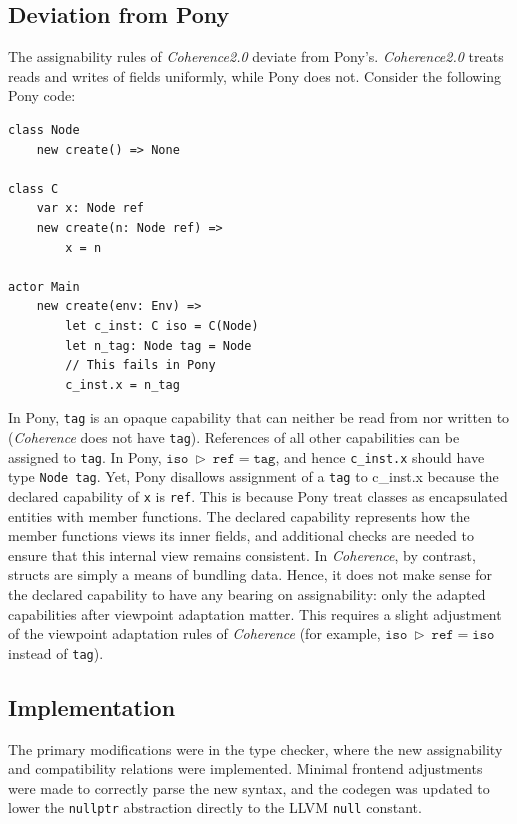 \subsection{Deviation from Pony} \label{sec:extension-pony-deviation}
The assignability rules of \textit{Coherence2.0} deviate from Pony's. \textit{Coherence2.0} treats reads and writes of fields uniformly, while Pony does not. Consider the following Pony code:
\begin{verbatim}
class Node
    new create() => None

class C
    var x: Node ref
    new create(n: Node ref) =>
        x = n

actor Main
    new create(env: Env) =>
        let c_inst: C iso = C(Node)
        let n_tag: Node tag = Node
        // This fails in Pony
        c_inst.x = n_tag
\end{verbatim}
In Pony, \texttt{tag} is an opaque capability that can neither be read from nor written to (\textit{Coherence} does not have \texttt{tag}). References of all other capabilities can be assigned to \texttt{tag}. In Pony, $\texttt{iso} \ \triangleright \ \texttt{ref} = \texttt{tag}$, and hence \texttt{c\_inst.x} should have type \texttt{Node tag}. Yet, Pony disallows assignment of a \texttt{tag} to c\_inst.x because the declared capability of \texttt{x} is \texttt{ref}. This is because Pony treat classes as encapsulated entities with member functions. The declared capability represents how the member functions views its inner fields, and additional checks are needed to ensure that this internal view remains consistent. In \textit{Coherence}, by contrast, structs are simply a means of bundling data. Hence, it does not make sense for the declared capability to have any bearing on assignability: only the adapted capabilities after viewpoint adaptation matter. This requires a slight adjustment of the viewpoint adaptation rules of \textit{Coherence} (for example, $\texttt{iso} \ \triangleright \ \texttt{ref} = \texttt{iso}$ instead of \texttt{tag}).


\subsection{Implementation}
The primary modifications were in the type checker, where the new assignability and compatibility relations were implemented. Minimal frontend adjustments were made to correctly parse the new syntax, and the codegen was updated to lower the \texttt{nullptr} abstraction directly to the LLVM \texttt{null} constant.

